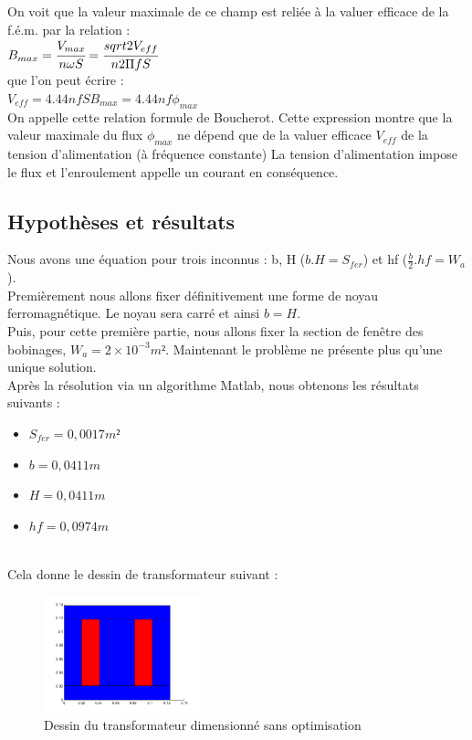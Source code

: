 On voit que la valeur maximale de ce champ est reliée à la valuer efficace de la f.é.m. par la relation :\\

$B_{max} =  \cfrac{V_{max}}{n\omega S} = \cfrac{sqrt{2}V_{eff}}{n 2\Pi f S}$ \\

que l'on peut écrire : \\

$V_{eff} = 4.44 n f S B_{max} = 4.44 n f \phi_{max}$\\


On appelle cette relation formule de Boucherot. Cette expression montre que la valeur maximale du flux $\phi_{max}$ ne dépend que de la valuer efficace $V_{eff} $ de la tension d'alimentation (à fréquence constante) La tension d'alimentation impose le flux et l'enroulement appelle un courant en conséquence. 

	
\subsection{Hypothèses et résultats}
Nous avons une équation pour trois inconnus : b, H ($b.H = S_{fer}$) et hf ($\frac{b}{2}.hf = W_a$).\\
Premièrement nous allons fixer définitivement une forme de noyau ferromagnétique. Le noyau sera carré et ainsi $b = H$.\\
Puis, pour cette première partie, nous allons fixer la section de fenêtre des bobinages, $W_a = 2\times{}10^{-3} m²$.
Maintenant le problème ne présente plus qu'une unique solution.\\

\newpage
Après la résolution via un algorithme Matlab, nous obtenons les résultats suivants : \\
\begin{itemize}
\item $S_{fer} = 0,0017 m² $
\item $b = 0,0411 m $
\item $H = 0,0411 m $
\item $hf = 0,0974 m $
\end{itemize}~\\

Cela donne le dessin de transformateur suivant :
\begin{figure}[h]
	\begin{center}
	\includegraphics[width=0.4\textwidth]{images/TP1_transfo_carre}
	\caption{Dessin du transformateur dimensionné sans optimisation}\label{img:dessinTransfoCarre}
	\end{center}
\end{figure}
\FloatBarrier 

